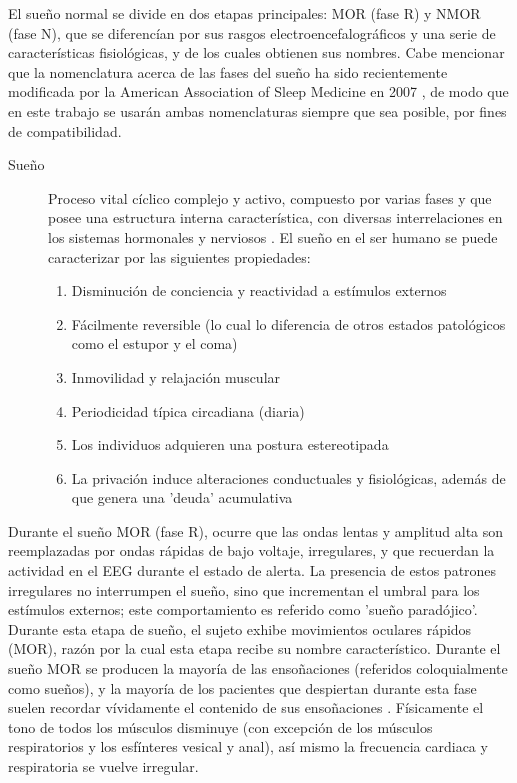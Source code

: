 \documentclass[12pt,a4paper]{mitthesis}
\begin{document}
El sue\~no normal se divide en dos etapas principales: MOR (fase R) y NMOR (fase N), que se 
diferenc\'ian por sus rasgos electroencefalogr\'aficos y una serie de caracter\'isticas 
fisiol\'ogicas, y de los cuales obtienen sus nombres.
Cabe mencionar que la nomenclatura acerca de las fases del sue\~no ha sido recientemente modificada 
por la American Association of Sleep Medicine en 2007 \cite{AASM07}, de modo que en este trabajo se 
usar\'an ambas nomenclaturas siempre que sea posible, por fines de compatibilidad.

\begin{description}
\item[Sue\~no] Proceso vital c\'iclico complejo y activo, compuesto por varias fases y que posee 
una estructura interna caracter\'istica, con diversas interrelaciones en los sistemas hormonales y 
nerviosos \cite{FernandezConde07}.
El sue\~no en el ser humano se puede caracterizar por las siguientes propiedades\cite{CarrilloMora}:
\begin{enumerate}
\item Disminuci\'on de conciencia y reactividad a est\'imulos externos
\item F\'acilmente reversible (lo cual lo diferencia de otros estados 
patol\'ogicos como el estupor y el coma)
\item Inmovilidad y relajaci\'on muscular
\item Periodicidad t\'ipica circadiana (diaria)
\item Los individuos adquieren una postura estereotipada
\item La privaci\'on induce alteraciones conductuales y 
fisiol\'ogicas, adem\'as de que genera una 'deuda' acumulativa
\end{enumerate}
\end{description}

Durante el sue\~no MOR (fase R), ocurre que las ondas lentas y amplitud alta son reemplazadas por 
ondas r\'apidas de bajo voltaje, irregulares, y que recuerdan la actividad en el EEG durante el 
estado de alerta.
La presencia de estos patrones irregulares no interrumpen el sue\~no, sino que incrementan el 
umbral para los est\'imulos externos; este comportamiento es referido como 'sue\~no parad\'ojico'.
Durante esta etapa de sue\~no, el sujeto exhibe movimientos oculares r\'apidos (MOR), raz\'on por 
la cual esta etapa recibe su nombre caracter\'istico.
Durante el sue\~no MOR se producen la mayor\'ia de las enso\~naciones (referidos coloquialmente 
como sue\~nos), y la mayor\'ia de los pacientes que despiertan durante esta fase suelen recordar 
v\'ividamente el contenido de sus enso\~naciones \cite{Chokroverty09}.
F\'isicamente el tono de todos los m\'usculos disminuye (con excepción de los m\'usculos 
respiratorios y los esf\'interes vesical y anal), as\'i mismo la frecuencia cardiaca y respiratoria 
se vuelve irregular.
\end{document}
